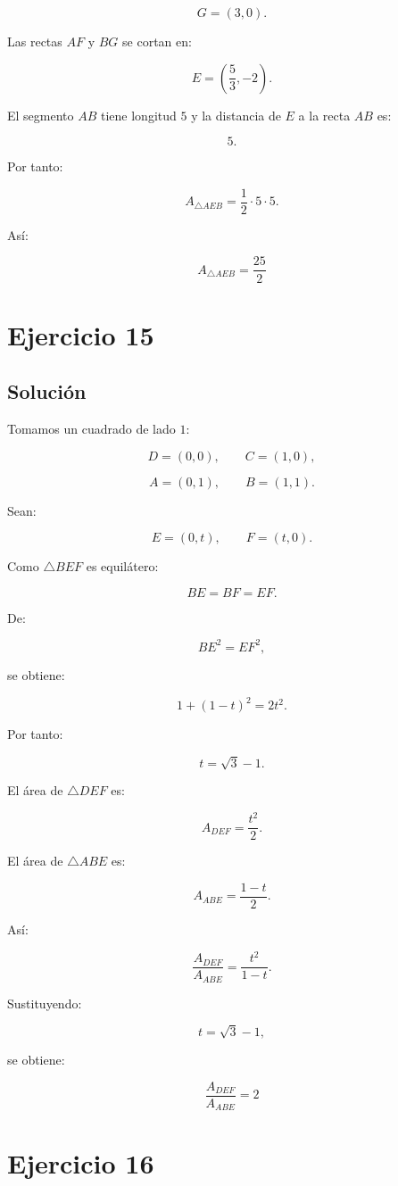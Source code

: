 \documentclass[11pt,a4paper]{article}
\begin{document}
\[
G=(3,0).
\]

Las rectas \(AF\) y \(BG\) se cortan en:

\[
E=
\left(
\frac53,-2
\right).
\]

El segmento \(AB\) tiene longitud \(5\) y la distancia de \(E\) a la recta \(AB\) es:

\[
5.
\]

Por tanto:

\[
A_{\triangle AEB}
=
\frac12\cdot5\cdot5.
\]

Así:

\[
\boxed{
A_{\triangle AEB}
=
\frac{25}{2}
}
\]

\section{Ejercicio 15}
\subsection{Solución}

Tomamos un cuadrado de lado \(1\):

\[
D=(0,0),
\qquad
C=(1,0),
\]

\[
A=(0,1),
\qquad
B=(1,1).
\]

Sean:

\[
E=(0,t),
\qquad
F=(t,0).
\]

Como \(\triangle BEF\) es equilátero:

\[
BE=BF=EF.
\]

De:

\[
BE^2=EF^2,
\]

se obtiene:

\[
1+(1-t)^2=2t^2.
\]

Por tanto:

\[
t=\sqrt3-1.
\]

El área de \(\triangle DEF\) es:

\[
A_{DEF}
=
\frac{t^2}{2}.
\]

El área de \(\triangle ABE\) es:

\[
A_{ABE}
=
\frac{1-t}{2}.
\]

Así:

\[
\frac{A_{DEF}}{A_{ABE}}
=
\frac{t^2}{1-t}.
\]

Sustituyendo:

\[
t=\sqrt3-1,
\]

se obtiene:

\[
\boxed{
\frac{A_{DEF}}{A_{ABE}}=2
}
\]

\section{Ejercicio 16}
\end{document}
